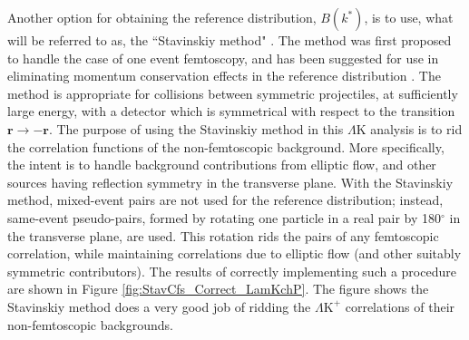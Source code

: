 \documentclass[ALICE,manyauthors]{cernphprep}
\newcommand{\LamK}{$\Lambda$K\xspace}
\newcommand{\LamKchP}{$\Lambda\mathrm{K^{+}}$\xspace}
\newcommand{\LamKchPALamKchM}{$\Lambda\mathrm{K^{+}}$ ($\overline{\Lambda}\mathrm{K^{-}}$)\xspace}
\begin{document}
Another option for obtaining the reference distribution, $B(k^{*})$, is to use, what will be referred to as, the ``Stavinskiy method" \cite{Stavinskiy04}.
The method was first proposed to handle the case of one event femtoscopy, and has been suggested for use in eliminating momentum conservation effects in the reference distribution \cite{Lisa:2005dd}.
The method is appropriate for collisions between symmetric projectiles, at sufficiently large energy, with a detector which is symmetrical with respect to the transition $\mathbf{r} \rightarrow \mathbf{-r}$.
The purpose of using the Stavinskiy method in this \LamK analysis is to rid the correlation functions of the non-femtoscopic background.  
More specifically, the intent is to handle background contributions from elliptic flow, and other sources having reflection symmetry in the transverse plane.  
With the Stavinskiy method, mixed-event pairs are not used for the reference distribution; instead, same-event pseudo-pairs, formed by rotating one particle in a real pair by 180$^\circ$ in the transverse plane, are used.  
This rotation rids the pairs of any femtoscopic correlation, while maintaining correlations due to elliptic flow (and other suitably symmetric contributors).
The results of correctly implementing such a procedure are shown in Figure \ref{fig:StavCfs_Correct_LamKchP}.  
The figure shows the Stavinskiy method does a very good job of ridding the \LamKchP correlations of their non-femtoscopic backgrounds.  

\begin{comment}
\begin{figure}[h!]
  \centering
  \texttt{[image: /home/jesse/Analysis/FemtoAnalysis/AnalysisNotes/4\_CorrelationFunctions/Figures/OnlyTwo/canKStarCfsLamKchPwConj\_20180505vs20180505StavCf\_CustomRebin.pdf]}
  \caption[\LamKchP Stavinskiy Correlation Functions]
  {
  \LamKchPALamKchM correlation functions built using the Stavinskiy method for 0--10\%, 10--30\%, and 30--50\% centralities.  
  Closed (red) symbols represent correlations built using the normal mixed-event reference distribution, while open (green) symbols represent correlations formed using the Stavinskiy same-event pseudo-pairs as a reference.
  }
  \label{fig:StavCfs_Correct_LamKchP}
\end{figure}
\end{comment}
\end{document}
